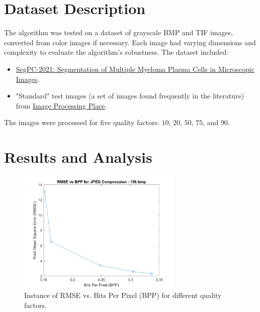 \documentclass{article}
\begin{document}

\section{Dataset Description}
The algorithm was tested on a dataset of grayscale BMP and TIF images, converted from color images if necessary. Each image had varying dimensions and complexity to evaluate the algorithm's robustness. The dataset included:
\begin{itemize}
    \item \href{https://www.kaggle.com/datasets/sbilab/segpc2021dataset}{SegPC-2021: Segmentation of Multiple Myeloma Plasma Cells in Microscopic Images}.
    \item "Standard" test images (a set of images found frequently in the literature) from \href{https://www.imageprocessingplace.com/root_files_V3/image_databases.htm}{Image Processing Place}.
\end{itemize}

The images were processed for five quality factors: $10$, $20$, $50$, $75$, and $90$.

\section{Results and Analysis}
\begin{figure}[!htb]
    \centering
    \includegraphics[width=0.7\textwidth]{images/106_rmse_vs_bpp.png}
    \caption{Instance of RMSE vs. Bits Per Pixel (BPP) for different quality factors.}
    \label{fig:rmse_bpp_plot}
\end{figure}
\end{document}
